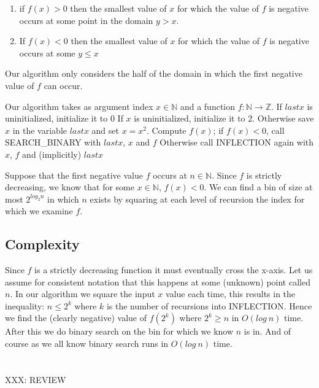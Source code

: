 \documentclass{amsart}
\theoremstyle{definition}
\theoremstyle{remark}
\numberwithin{equation}{section}
\newcommand{\NN}{\mathbb N}
\newcommand{\ZZ}{\mathbb Z}
\begin{document}
\begin{enumerate}

  \item if $f(x) > 0$ then the smallest value of $x$ for which the value
of $f$ is negative occurs at some point in the domain $y>x$.

  \item If $f(x) < 0$ then the smallest value of $x$ for which the value
  of $f$ is negative occurs at some $y \leq x$

\end{enumerate}

Our algorithm only considers the half of the domain in which the first negative
value of $f$ can occur.


Our algorithm takes as argument index $x \in \NN$ and a function $f :
\NN \rightarrow \ZZ$. If $lastx$ is uninitialized, initialize it to $0$
If $x$ is uninitialized, initialize it to $2$. Otherwise save $x$ in the
variable $lastx$ and set $x = x^2$. Compute $f(x)$; if $f(x) < 0$, call
SEARCH\_BINARY with $lastx$, $x$ and $f$ Otherwise call INFLECTION again
with $x$, $f$ and (implicitly) $lastx$

\proof
Suppose that the first negative value $f$ occurs at $n \in \NN$.
Since $f$ is strictly decreasing, we know that for some $x \in \NN$, $f(x) < 0$.
We can find a bin of size at most $2^{log_{2} {n}}$ in which $n$ exists by
squaring at each level of recursion the index for which we examine $f$.

\subsection{Complexity}

Since $f$ is a strictly decreasing function it must eventually cross the
x-axis. Let us assume for consistent notation that this happens at some
(unknown) point called $n$. In our algorithm we square the input $x$
value each time, this results in the inequality: $n \leq 2^k$ where $k$
is the number of recursions into INFLECTION. Hence we find the (clearly
negative) value of $f(2^k)$ where $2^k \geq n$ in $O(log\ n)$ time.
After this we do binary search on the bin for which we know $n$ is in.
And of course as we all know binary search runs in $O( log\ n )$ time.


\section{}
XXX: REVIEW
\end{document}
